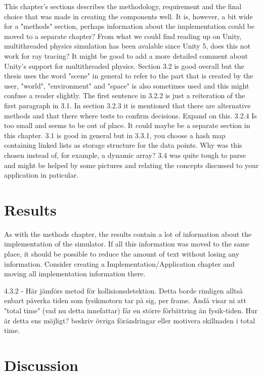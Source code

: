 \documentclass[12pt,a4paper,twoside,openright]{report}
\begin{document}
	This chapter's sections describes the methodology, requirement and the
	final choice that was made in creating the components well. It is, however,
	a bit wide for a "methods" section, perhaps information about the
	implementation could be moved to a separate chapter?  From what we could
	find reading up on Unity, multithreaded physics simulation has been
	avalable since Unity 5, does this not work for ray tracing? It might be
	good to add a more detailed comment about Unity's support for multithreaded
	physics. Section 3.2 is good overall but the thesis uses the word "scene"
	in general to refer to the part that is created by the user, "world",
	"environment" and "space" is also sometimes used and this might confuse a
	reader slightly. The first sentence in 3.2.2 is just a reiteration of the
	first paragraph in 3.1. In section 3.2.3 it is mentioned that there are
	alternative methods and that there where tests to confirm decisions. Expand
	on this.  3.2.4 Is too small and seems to be out of place.  It could maybe
	be a separate section in this chapter. 3.1 is good in general but in 3.3.1,
	you choose a hash map containing linked lists as storage structure for the
	data points. Why was this chosen instead of, for example, a dynamic array?
	3.4 was quite tough to parse and might be helped by some pictures and
	relating the concepts discussed to your application in paticular.

\section*{Results}

	As with the methods chapter, the results contain a lot of information about
	the implementation of the simulator. If all this information was moved to
	the same place, it should be possible to reduce the amount of text without
	losing any information. Consider creating a Implementation/Application 
	chapter and moving all implementation information there.
	
	4.3.2 - Här jämförs metod för kollisionsdetektion. Detta borde rimligen 
	alltså enbart påverka tiden som fysikmotorn tar på sig, per frame. Ändå 
	visar ni att "total time" (vad nu detta innefattar) får en större 
	förbättring än fysik-tiden. Hur är detta ens möjligt? beskriv övriga 
	förändringar eller motivera skillnaden i total time.


\section*{Discussion}
\end{document}
